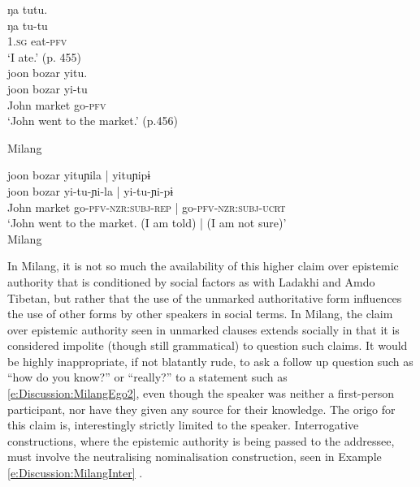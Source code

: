 \begin{exe}
    \ex\label{e:Discussion:MilangEgo}
    \begin{xlist}
        \ex \label{e:Discussion:MilangEgo1}
        \glll ŋa tutu. \\
        ŋa tu-tu \\
        1.\textsc{sg} eat-\textsc{pfv} \\
        \glt `I ate.' (p. 455) \\

        \ex \label{e:Discussion:MilangEgo2}
        \glll joon bozar yitu. \\
        joon bozar yi-tu \\
        John market go-\textsc{pfv} \\
        \glt `John went to the market.' (p.456) \\
    \end{xlist}
    Milang \cite[Siangic: India,][]{Modi2017}
\end{exe}
\begin{exe}
    \ex \label{e:Discussion:MilangNonEgo}
    \glll joon bozar yituɲila | yituɲipɨ \\
    joon bozar yi-tu-ɲi-la | yi-tu-ɲi-pɨ \\
    John market go-\textsc{pfv}-\textsc{nzr:subj}-\textsc{rep} | go-\textsc{pfv}-\textsc{nzr:subj}-\textsc{ucrt} \\
    \glt `John went to the market. (I am told) | (I am not sure)' \\
    Milang \cite[Siangic: India][457, given as two examples in source and combined here]{Modi2017}
\end{exe}

In Milang, it is not so much the availability of this higher claim over epistemic authority that is conditioned by social factors as with Ladakhi and Amdo Tibetan, but rather that the use of the unmarked authoritative form influences the use of other forms by other speakers in social terms. In Milang, the claim over epistemic authority seen in unmarked clauses extends socially in that it is considered impolite (though still grammatical) to question such claims. It would be highly inappropriate, if not blatantly rude, to ask a follow up question such as ``how do you know?'' or ``really?'' to a statement such as \ref{e:Discussion:MilangEgo2}, even though the speaker was neither a first-person participant, nor have they given any source for their knowledge. The origo for this claim is, interestingly strictly limited to the speaker. Interrogative constructions, where the epistemic authority is being passed to the addressee, must involve the neutralising nominalisation construction, seen in Example \ref{e:Discussion:MilangInter} \cite[457]{Modi2017}.

